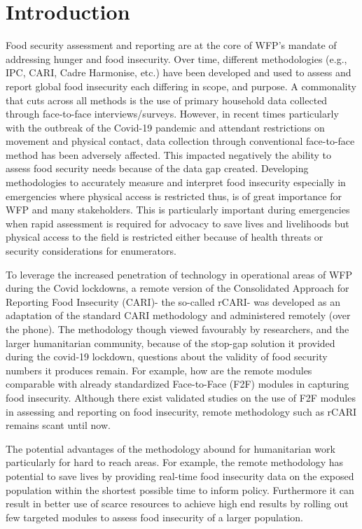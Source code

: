 \documentclass[11pt,harvard]{article}
\begin{document}
\pagebreak
	
\section{Introduction}

Food security assessment and reporting are at the core of WFP’s mandate of addressing hunger and food insecurity. Over time, different methodologies (e.g., IPC, CARI, Cadre Harmonise, etc.) have been developed and used to assess and report global food insecurity each differing in scope, and purpose. A commonality that cuts across all methods is the use of primary household data collected through face-to-face interviews/surveys. However, in recent times particularly with the outbreak of the Covid-19 pandemic and attendant restrictions on movement and physical contact, data collection through conventional face-to-face method has been adversely affected. This impacted negatively the ability to assess food security needs because of the data gap created. Developing methodologies to accurately measure and interpret food insecurity especially in emergencies where physical access is restricted thus, is of great importance for WFP and many stakeholders. This is particularly important during emergencies when rapid assessment is required for advocacy to save lives and livelihoods but physical access to the field is restricted either because of health threats or security considerations for enumerators. 

To leverage the increased penetration of technology in operational areas of WFP during the Covid lockdowns, a remote version of the Consolidated Approach for Reporting Food Insecurity (CARI)- the so-called rCARI- was developed as an adaptation of the standard CARI methodology and administered remotely (over the phone). The methodology though viewed favourably by researchers, and the larger humanitarian community, because of the stop-gap solution it provided during the covid-19 lockdown, questions about the validity of food security numbers it produces remain. For example, how are the remote modules comparable with already standardized Face-to-Face (F2F) modules in capturing food insecurity. Although there exist validated studies on the use of F2F modules in assessing and reporting on food insecurity, remote methodology such as rCARI remains scant until now. 

The potential advantages of the methodology abound for humanitarian work particularly for hard to reach areas. For example, the remote methodology has potential to save lives by providing real-time food insecurity data on the exposed population within the shortest possible time to inform policy. Furthermore it can result in better use of scarce resources to achieve high end results by rolling out few targeted modules to assess food insecurity of a larger population.  	
\end{document}
